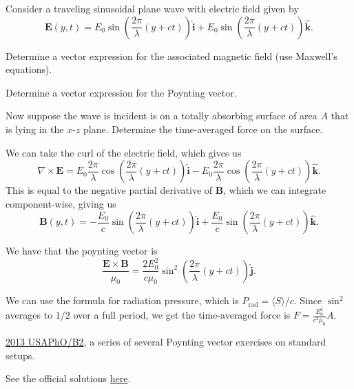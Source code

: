\documentclass[11pt]{scrartcl}
\newcommand{\officialsol}[1]{See the official solutions \href{#1}{here}.}
\begin{document}
\begin{prob}
    Consider a traveling sinusoidal plane wave with electric field given by
    $$\mathbf E(y,t) = E_0 \sin \left(\frac{2\pi}{\lambda}(y + ct)\right)\hat{\mathbf i} + E_0 \sin \left(\frac{2\pi}{\lambda}(y + ct)\right)\hat{\mathbf k}.$$
    \begin{anum}
        \item Determine a vector expression for the associated magnetic field (use Maxwell's equations).
        \item Determine a vector expression for the Poynting vector.
        \item Now suppose the wave is incident is on a totally absorbing surface of area $A$ that is lying in the $x$-$z$ plane. Determine the time-averaged force on the surface.
    \end{anum}
\end{prob}
\begin{alphasol}
    \item We can take the curl of the electric field, which gives us
    $$\nabla \times \mathbf E = E_0 \frac{2\pi}{\lambda} \cos \left(\frac{2\pi}{\lambda} (y + ct) \right) \hat{\mathbf i} - E_0 \frac{2\pi}{\lambda} \cos \left(\frac{2\pi}{\lambda} (y + ct) \right) \hat{\mathbf k}.$$
    This is equal to the negative partial derivative of $\mathbf B$, which we can integrate component-wise, giving us
    $$\mathbf B(y,t) = -\frac{E_0}{c}\sin \left(\frac{2\pi}{\lambda} (y+ct)\right)\hat{\mathbf i} + \frac{E_0}{c} \sin \left(\frac{2\pi}{\lambda}(y + ct) \right) \hat{\mathbf k}.$$
    \item We have that the poynting vector is
    $$\frac{\mathbf E \times \mathbf B}{\mu_0} = \frac{2E_0^2}{c\mu_0}\sin^2 \left(\frac{2\pi}{\lambda} (y+ct)\right) \hat{\mathbf j}.$$
    \item We can use the formula for radiation pressure, which is $P_{\text{rad}} = \langle S \rangle /c.$ Since $\sin^2$ averages to $1/2$ over a full period, we get the time-averaged force is $F = \frac{E_0^2}{c^2\mu_0}A.$
\end{alphasol}




\begin{prob}\label{pr:poynting_excs}
    \href{https://www.aapt.org/physicsteam/2014/upload/E3-1-7.pdf#page=8}{2013 USAPhO/B2}, a series of several Poynting vector exercises on standard setups.
\end{prob}
\begin{sol}
    \officialsol{https://aapt.org/physicsteam/2019/upload/USAPhO-2013-Solutions.pdf\#page=14}
\end{sol}
\end{document}
